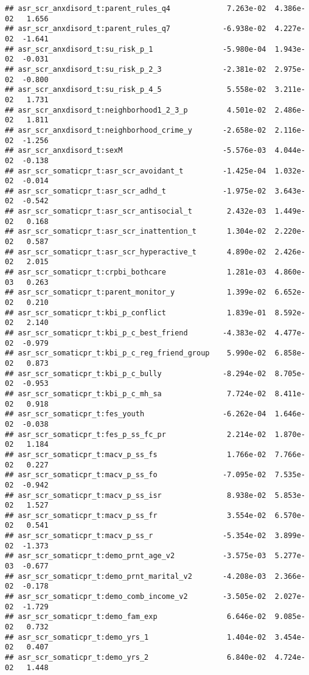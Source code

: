 \documentclass[
]{article}
\begin{document}
\begin{verbatim}
## asr_scr_anxdisord_t:parent_rules_q4             7.263e-02  4.386e-02   1.656
## asr_scr_anxdisord_t:parent_rules_q7            -6.938e-02  4.227e-02  -1.641
## asr_scr_anxdisord_t:su_risk_p_1                -5.980e-04  1.943e-02  -0.031
## asr_scr_anxdisord_t:su_risk_p_2_3              -2.381e-02  2.975e-02  -0.800
## asr_scr_anxdisord_t:su_risk_p_4_5               5.558e-02  3.211e-02   1.731
## asr_scr_anxdisord_t:neighborhood1_2_3_p         4.501e-02  2.486e-02   1.811
## asr_scr_anxdisord_t:neighborhood_crime_y       -2.658e-02  2.116e-02  -1.256
## asr_scr_anxdisord_t:sexM                       -5.576e-03  4.044e-02  -0.138
## asr_scr_somaticpr_t:asr_scr_avoidant_t         -1.425e-04  1.032e-02  -0.014
## asr_scr_somaticpr_t:asr_scr_adhd_t             -1.975e-02  3.643e-02  -0.542
## asr_scr_somaticpr_t:asr_scr_antisocial_t        2.432e-03  1.449e-02   0.168
## asr_scr_somaticpr_t:asr_scr_inattention_t       1.304e-02  2.220e-02   0.587
## asr_scr_somaticpr_t:asr_scr_hyperactive_t       4.890e-02  2.426e-02   2.015
## asr_scr_somaticpr_t:crpbi_bothcare              1.281e-03  4.860e-03   0.263
## asr_scr_somaticpr_t:parent_monitor_y            1.399e-02  6.652e-02   0.210
## asr_scr_somaticpr_t:kbi_p_conflict              1.839e-01  8.592e-02   2.140
## asr_scr_somaticpr_t:kbi_p_c_best_friend        -4.383e-02  4.477e-02  -0.979
## asr_scr_somaticpr_t:kbi_p_c_reg_friend_group    5.990e-02  6.858e-02   0.873
## asr_scr_somaticpr_t:kbi_p_c_bully              -8.294e-02  8.705e-02  -0.953
## asr_scr_somaticpr_t:kbi_p_c_mh_sa               7.724e-02  8.411e-02   0.918
## asr_scr_somaticpr_t:fes_youth                  -6.262e-04  1.646e-02  -0.038
## asr_scr_somaticpr_t:fes_p_ss_fc_pr              2.214e-02  1.870e-02   1.184
## asr_scr_somaticpr_t:macv_p_ss_fs                1.766e-02  7.766e-02   0.227
## asr_scr_somaticpr_t:macv_p_ss_fo               -7.095e-02  7.535e-02  -0.942
## asr_scr_somaticpr_t:macv_p_ss_isr               8.938e-02  5.853e-02   1.527
## asr_scr_somaticpr_t:macv_p_ss_fr                3.554e-02  6.570e-02   0.541
## asr_scr_somaticpr_t:macv_p_ss_r                -5.354e-02  3.899e-02  -1.373
## asr_scr_somaticpr_t:demo_prnt_age_v2           -3.575e-03  5.277e-03  -0.677
## asr_scr_somaticpr_t:demo_prnt_marital_v2       -4.208e-03  2.366e-02  -0.178
## asr_scr_somaticpr_t:demo_comb_income_v2        -3.505e-02  2.027e-02  -1.729
## asr_scr_somaticpr_t:demo_fam_exp                6.646e-02  9.085e-02   0.732
## asr_scr_somaticpr_t:demo_yrs_1                  1.404e-02  3.454e-02   0.407
## asr_scr_somaticpr_t:demo_yrs_2                  6.840e-02  4.724e-02   1.448

\end{verbatim}
\end{document}

